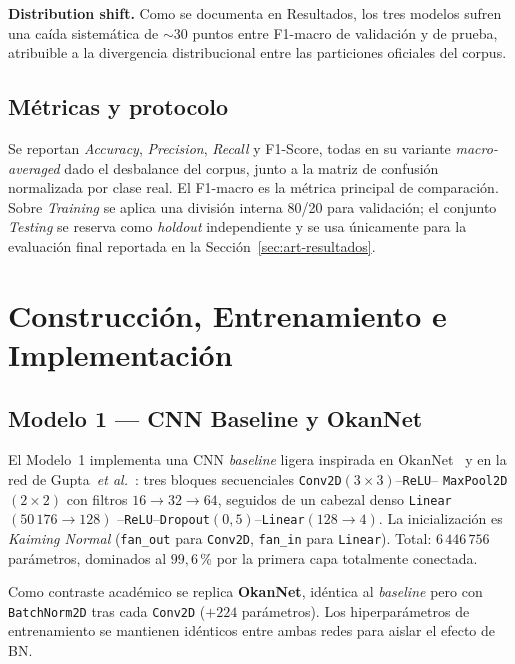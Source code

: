 \documentclass[conference]{IEEEtran}
\begin{document}
\textbf{Distribution shift.} Como se documenta en
Resultados, los tres modelos sufren una caída sistemática de
$\sim 30$ puntos entre F1-macro de validación
y de prueba, atribuible a la divergencia distribucional entre
las particiones oficiales del corpus.

\subsection{Métricas y protocolo}

Se reportan \textit{Accuracy}, \textit{Precision},
\textit{Recall} y F1-Score, todas en su variante
\textit{macro-averaged} dado el desbalance del corpus, junto a
la matriz de confusión normalizada por clase real. El F1-macro
es la métrica principal de comparación. Sobre \textit{Training}
se aplica una división interna 80/20 para validación; el
conjunto \textit{Testing} se reserva como \textit{holdout}
independiente y se usa únicamente para la evaluación final
reportada en la Sección~\ref{sec:art-resultados}.

\section{Construcción, Entrenamiento e Implementación}

\subsection{Modelo 1 --- CNN Baseline y OkanNet}
\label{sec:art-m1}

El Modelo~1 implementa una CNN \textit{baseline} ligera
inspirada en OkanNet~\cite{okannet2026} y en la red de
Gupta~\textit{et al.}~\cite{gupta2023}: tres bloques
secuenciales \texttt{Conv2D}$(3{\times}3)$--\texttt{ReLU}--%
\texttt{MaxPool2D}$(2{\times}2)$ con filtros $16{\to}32{\to}64$,
seguidos de un cabezal denso \texttt{Linear}$(50\,176{\to}128)$%
--\texttt{ReLU}--\texttt{Dropout}$(0{,}5)$--\texttt{Linear}$(128{\to}4)$.
La inicialización es \textit{Kaiming Normal}
(\texttt{fan\_out} para \texttt{Conv2D}, \texttt{fan\_in} para
\texttt{Linear}). Total: $6\,446\,756$ parámetros, dominados al
$99{,}6$\,\% por la primera capa totalmente conectada.

Como contraste académico se replica \textbf{OkanNet}, idéntica
al \textit{baseline} pero con \texttt{BatchNorm2D} tras cada
\texttt{Conv2D} ($+224$ parámetros). Los hiperparámetros de
entrenamiento se mantienen idénticos entre ambas redes para
aislar el efecto de BN.
\end{document}
